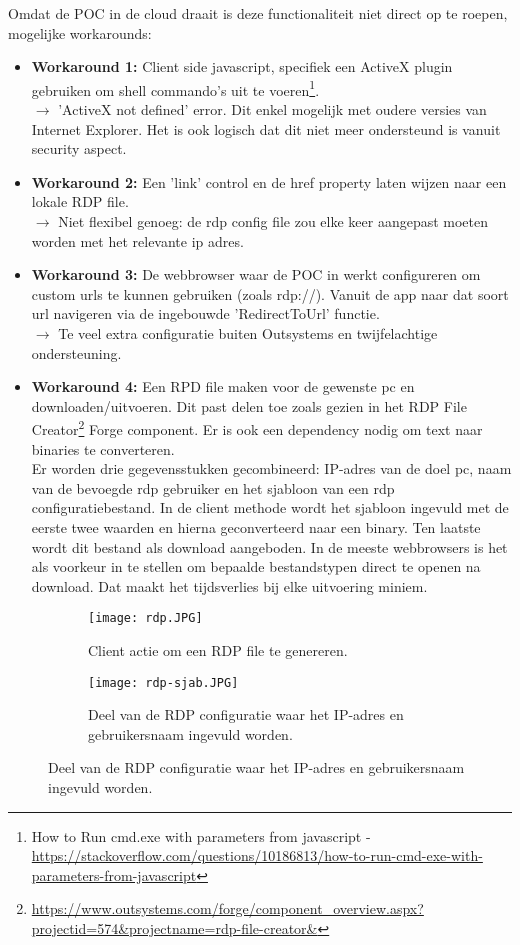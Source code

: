 Omdat de POC in de cloud draait is deze functionaliteit niet direct op te roepen, mogelijke workarounds:
\begin{itemize}
    \item \textbf{Workaround 1:} Client side javascript, specifiek een ActiveX plugin gebruiken om shell commando's uit te voeren\footnote{How to Run cmd.exe with parameters from javascript - \url{https://stackoverflow.com/questions/10186813/how-to-run-cmd-exe-with-parameters-from-javascript}}.\\
    $\rightarrow$ 'ActiveX not defined' error. Dit enkel mogelijk met oudere versies van Internet Explorer. Het is ook logisch dat dit niet meer ondersteund is vanuit security aspect.
    \item \textbf{Workaround 2:} Een 'link' control en de href property laten wijzen naar een lokale RDP file.\\
    $\rightarrow$ Niet flexibel genoeg: de rdp config file zou elke keer aangepast moeten worden met het relevante ip adres.
    \item \textbf{Workaround 3:} De webbrowser waar de POC in werkt configureren om custom urls te kunnen gebruiken (zoals rdp://). Vanuit de app naar dat soort url navigeren via de ingebouwde 'RedirectToUrl' functie.\\
    $\rightarrow$ Te veel extra configuratie buiten Outsystems en twijfelachtige ondersteuning.
    \item \textbf{Workaround 4:} Een RPD file maken voor de gewenste pc en downloaden/uitvoeren. Dit past delen toe zoals gezien in het RDP File Creator\footnote{\url{https://www.outsystems.com/forge/component_overview.aspx?projectid=574&projectname=rdp-file-creator&}} Forge component. Er is ook een dependency nodig om text naar binaries te converteren.\\
    Er worden drie gegevensstukken gecombineerd: IP-adres van de doel pc, naam van de bevoegde rdp gebruiker en het sjabloon van een rdp configuratiebestand. In de client methode wordt het sjabloon ingevuld met de eerste twee waarden en hierna geconverteerd naar een binary. Ten laatste wordt dit bestand als download aangeboden. In de meeste webbrowsers is het als voorkeur in te stellen om bepaalde bestandstypen direct te openen na download. Dat maakt het tijdsverlies bij elke uitvoering miniem.
\end{itemize}

\begin{figure}[h!]
    \begin{subfigure}[b]{0.8\linewidth}
        \texttt{[image: rdp.JPG]}
        \caption{Client actie om een RDP file te genereren.}
    \end{subfigure}
    \begin{subfigure}[b]{0.4\linewidth}
        \texttt{[image: rdp-sjab.JPG]}
        \caption{Deel van de RDP configuratie waar het IP-adres en gebruikersnaam ingevuld worden.}
    \end{subfigure}
    \label{fig:rdp-actie}
\end{figure}


